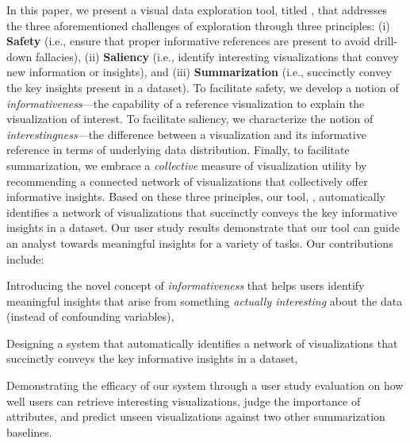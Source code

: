 \par In this paper, we present a visual data exploration tool, titled \system, that addresses the three aforementioned challenges of exploration through three principles: (i) \textbf{Safety} (i.e., ensure that proper informative references are present to avoid drill-down fallacies), (ii) \textbf{Saliency} (i.e., identify interesting visualizations that convey new information or insights), and (iii) \textbf{Summarization} (i.e., succinctly convey the key insights present in a dataset). To facilitate safety, we develop a notion of \emph{informativeness}---the capability of a reference visualization to explain the visualization of interest. To facilitate saliency, we characterize the notion of \emph{interestingness}---the difference between a visualization and its informative reference in terms of underlying data distribution. Finally, to facilitate summarization, we embrace a \emph{collective} measure of visualization utility by recommending a connected network of visualizations that collectively offer informative insights. Based on these three principles, our tool, \system, automatically identifies a network of visualizations that succinctly conveys the key informative insights in a dataset. Our user study results demonstrate that our tool can guide an analyst towards meaningful insights for a variety of tasks. Our contributions include:
\begin{denselist}
\item Introducing the novel concept of \emph{informativeness} that helps users identify meaningful insights that arise from something \textit{actually interesting} about the data (instead of confounding variables),
\item Designing a system that automatically identifies a network of visualizations that succinctly conveys the key informative insights in a dataset,
\item Demonstrating the efficacy of our system through a user study evaluation on how well users can retrieve interesting visualizations, judge the importance of attributes, and predict unseen visualizations against two other summarization baselines.
\end{denselist}
